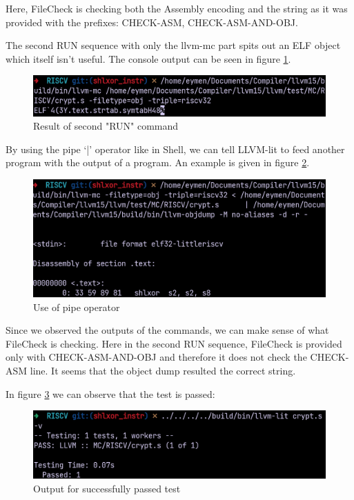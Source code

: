 Here, FileCheck is checking both the Assembly encoding and the string as it was provided with the prefixes: CHECK-ASM, CHECK-ASM-AND-OBJ.


The second RUN sequence with only the llvm-mc part spits out an ELF object which itself isn’t useful. The console output can be seen in figure \ref{fig:result_of_second_run_command}.
\begin{figure}
    \centering
    \includegraphics{testing/result_of_second_run_command.png}
    \caption{Result of second "RUN" command}
    \label{fig:result_of_second_run_command}
\end{figure}

By using the pipe ‘|’ operator like in Shell, we can tell LLVM-lit to feed another program with the output of a program. An example is given in figure \ref{fig:use_of_pipe_operator}.
\begin{figure}
    \centering
    \includegraphics{testing/use_of_pipe_operator.png}
    \caption{Use of pipe operator}
    \label{fig:use_of_pipe_operator}
\end{figure}

Since we observed the outputs of the commands, we can make sense of what FileCheck is checking. Here in the second RUN sequence, FileCheck is provided only with CHECK-ASM-AND-OBJ and therefore it does not check the CHECK-ASM line. It seems that the object dump resulted the correct string.

In figure \ref{fig:output_for_successfully_passed_test} we can observe that the test is passed:

\begin{figure}
    \centering
    \includegraphics{testing/output_for_successfully_passed_test.png}
    \caption{Output for successfully passed test}
    \label{fig:output_for_successfully_passed_test}
\end{figure}


